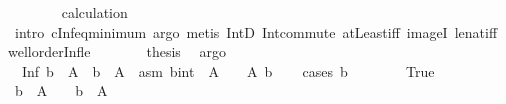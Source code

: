 \begin{isabellebody}
\ \ \ \ \ \ \isamarkupfalse%
\ calculation\ \isamarkupfalse%
\ {\isacharparenleft}{\kern0pt}intro\ cInf{\isacharunderscore}{\kern0pt}eq{\isacharunderscore}{\kern0pt}minimum{\isacharparenright}{\kern0pt}\ {\isacharparenleft}{\kern0pt}argo{\isacharcomma}{\kern0pt}\ metis\ IntD{}\ Int{\isacharunderscore}{\kern0pt}commute\ atLeast{\isacharunderscore}{\kern0pt}iff\ imageI\ le{\isacharunderscore}{\kern0pt}nat{\isacharunderscore}{\kern0pt}iff\ wellorder{\isacharunderscore}{\kern0pt}Inf{\isacharunderscore}{\kern0pt}le{}{\isacharparenright}{\kern0pt}\isanewline
\ \ \ \ \isamarkupfalse%
\ \isamarkupfalse%
\ {\isacharquery}{\kern0pt}thesis\ \isamarkupfalse%
\ argo\isanewline
\ \ \isamarkupfalse%
\isanewline
\ \ \isamarkupfalse%
\ {\isacharasterisk}{\kern0pt}{\isacharasterisk}{\kern0pt}{\isacharcolon}{\kern0pt}\ {\isachardoublequoteopen}Inf\ {\isacharparenleft}{\kern0pt}{\isacharbraceleft}{\kern0pt}b{\isachardot}{\kern0pt}{\isachardot}{\kern0pt}{\isacharbraceright}{\kern0pt}\ {\isasyminter}\ A{\isacharparenright}{\kern0pt}\ {\isasymin}\ {\isacharparenleft}{\kern0pt}{\isacharbraceleft}{\kern0pt}b{\isachardot}{\kern0pt}{\isachardot}{\kern0pt}{\isacharbraceright}{\kern0pt}\ {\isasyminter}\ A{\isacharparenright}{\kern0pt}{\isachardoublequoteclose}\ \ asm{\isacharcolon}{\kern0pt}\ {\isachardoublequoteopen}{\isacharparenleft}{\kern0pt}{\isacharbraceleft}{\kern0pt}{\isacharparenleft}{\kern0pt}b{\isacharcolon}{\kern0pt}{\isacharcolon}{\kern0pt}int{\isacharparenright}{\kern0pt}{\isachardot}{\kern0pt}{\isachardot}{\kern0pt}{\isacharbraceright}{\kern0pt}\ {\isasyminter}\ A{\isacharparenright}{\kern0pt}\ {\isasymnoteq}\ {\isacharbraceleft}{\kern0pt}{\isacharbraceright}{\kern0pt}{\isachardoublequoteclose}\ \ A\ b\isanewline
\ \ \isamarkupfalse%
\ {\isacharparenleft}{\kern0pt}cases\ {\isachardoublequoteopen}b\ {\isasymge}\ {}{\isachardoublequoteclose}{\isacharparenright}{\kern0pt}\isanewline
\ \ \ \ \isamarkupfalse%
\ True\isanewline
\ \ \ \ \isamarkupfalse%
\ {\isachardoublequoteopen}{\isacharparenleft}{\kern0pt}{\isacharbraceleft}{\kern0pt}b{\isachardot}{\kern0pt}{\isachardot}{\kern0pt}{\isacharbraceright}{\kern0pt}\ {\isasyminter}\ A{\isacharparenright}{\kern0pt}\ {\isacharequal}{\kern0pt}\ {\isacharbraceleft}{\kern0pt}{}{\isachardot}{\kern0pt}{\isachardot}{\kern0pt}{\isacharbraceright}{\kern0pt}\ {\isasyminter}\ {\isacharparenleft}{\kern0pt}{\isacharbraceleft}{\kern0pt}b{\isachardot}{\kern0pt}{\isachardot}{\kern0pt}{\isacharbraceright}{\kern0pt}\ {\isasyminter}\ A{\isacharparenright}{\kern0pt}{\isachardoublequoteclose}\ \isamarkupfalse%

\end{isabellebody}
